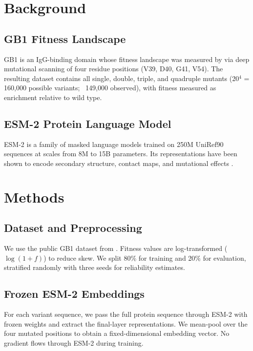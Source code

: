 \documentclass{article}
\begin{document}
\section{Background}
\label{sec:background}

\subsection{GB1 Fitness Landscape}
GB1 is an IgG-binding domain whose fitness landscape was measured by \citet{wu2016adaptation} via deep mutational scanning of four residue positions (V39, D40, G41, V54). The resulting dataset contains all single, double, triple, and quadruple mutants (20$^4$ = 160,000 possible variants; ~149,000 observed), with fitness measured as enrichment relative to wild type.

\subsection{ESM-2 Protein Language Model}
ESM-2 \citep{lin2023evolutionary} is a family of masked language models trained on 250M UniRef90 sequences at scales from 8M to 15B parameters. Its representations have been shown to encode secondary structure, contact maps, and mutational effects \citep{meier2021language}.

\section{Methods}
\label{sec:methods}

\subsection{Dataset and Preprocessing}
We use the public GB1 dataset from \citet{wu2016adaptation}. Fitness values are log-transformed ($\log(1 + f)$) to reduce skew. We split 80\% for training and 20\% for evaluation, stratified randomly with three seeds for reliability estimates.

\subsection{Frozen ESM-2 Embeddings}
For each variant sequence, we pass the full protein sequence through ESM-2 with frozen weights and extract the final-layer representations. We mean-pool over the four mutated positions to obtain a fixed-dimensional embedding vector. No gradient flows through ESM-2 during training.
\end{document}
